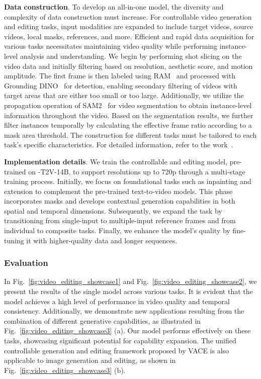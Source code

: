 \textbf{Data construction}. To develop an all-in-one model, the diversity and complexity of data construction must increase. For controllable video generation and editing tasks, input modalities are expanded to include target videos, source videos, local masks, references, and more. Efficient and rapid data acquisition for various tasks necessitates maintaining video quality while performing instance-level analysis and understanding. We begin by performing shot slicing on the video data and initially filtering based on resolution, aesthetic score, and motion amplitude. The first frame is then labeled using RAM~\citep{ram} and processed with Grounding DINO~\citep{groundingdino} for detection, enabling secondary filtering of videos with target areas that are either too small or too large. Additionally, we utilize the propagation operation of SAM2~\citep{sam2} for video segmentation to obtain instance-level information throughout the video. Based on the segmentation results, we further filter instances temporally by calculating the effective frame ratio according to a mask area threshold. The construction for different tasks must be tailored to each task's specific characteristics. For detailed information, refer to the work~\citep{vace}.

\textbf{Implementation details}. We train the controllable and editing model, pre-trained on \method-T2V-14B, to support resolutions up to 720p through a multi-stage training process. Initially, we focus on foundational tasks such as inpainting and extension to complement the pre-trained text-to-video models. 
%
This phase incorporates masks and develops contextual generation capabilities in both spatial and temporal dimensions. Subsequently, we expand the task by transitioning from single-input to multiple-input reference frames and from individual to composite tasks. Finally, we enhance the model's quality by fine-tuning it with higher-quality data and longer sequences.


\subsubsection{Evaluation}

In Fig.~\ref{fig:video_editing_showcase1} and Fig.~\ref{fig:video_editing_showcase2}, we present the results of the \method single model across various tasks. 
%
It is evident that the model achieves a high level of performance in video quality and temporal consistency. Additionally, we demonstrate new applications resulting from the combination of different generative capabilities, as illustrated in Fig.~\ref{fig:video_editing_showcase3} (a). Our model performs effectively on these tasks, showcasing significant potential for capability expansion. 
%
The unified controllable generation and editing framework proposed by VACE is also applicable to image generation and editing, as shown in Fig.~\ref{fig:video_editing_showcase3} (b).

